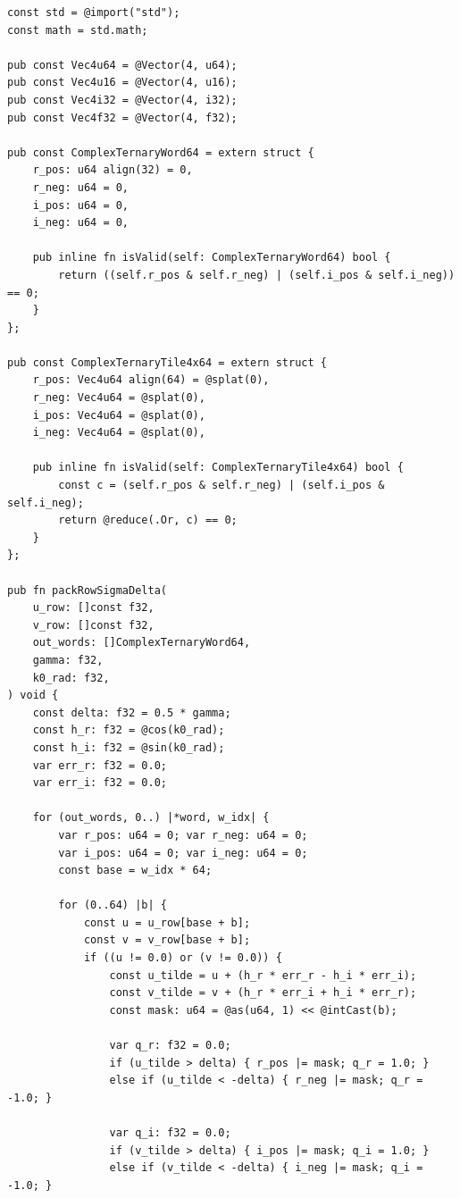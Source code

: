 \documentclass[10pt, twocolumn, a4paper]{article}
\begin{document}
\begin{lstlisting}[caption={Zig $\Sigma\Delta$ bit-plane packer and 4-row SIMD contraction kernel. The packer uses \texttt{f32} arithmetic; see Section~\ref{sec:seal}.}]
const std = @import("std");
const math = std.math;

pub const Vec4u64 = @Vector(4, u64);
pub const Vec4u16 = @Vector(4, u16);
pub const Vec4i32 = @Vector(4, i32);
pub const Vec4f32 = @Vector(4, f32);

pub const ComplexTernaryWord64 = extern struct {
    r_pos: u64 align(32) = 0,
    r_neg: u64 = 0,
    i_pos: u64 = 0,
    i_neg: u64 = 0,

    pub inline fn isValid(self: ComplexTernaryWord64) bool {
        return ((self.r_pos & self.r_neg) | (self.i_pos & self.i_neg)) == 0;
    }
};

pub const ComplexTernaryTile4x64 = extern struct {
    r_pos: Vec4u64 align(64) = @splat(0),
    r_neg: Vec4u64 = @splat(0),
    i_pos: Vec4u64 = @splat(0),
    i_neg: Vec4u64 = @splat(0),

    pub inline fn isValid(self: ComplexTernaryTile4x64) bool {
        const c = (self.r_pos & self.r_neg) | (self.i_pos & self.i_neg);
        return @reduce(.Or, c) == 0;
    }
};

pub fn packRowSigmaDelta(
    u_row: []const f32,
    v_row: []const f32,
    out_words: []ComplexTernaryWord64,
    gamma: f32,
    k0_rad: f32,
) void {
    const delta: f32 = 0.5 * gamma;
    const h_r: f32 = @cos(k0_rad);
    const h_i: f32 = @sin(k0_rad);
    var err_r: f32 = 0.0;
    var err_i: f32 = 0.0;

    for (out_words, 0..) |*word, w_idx| {
        var r_pos: u64 = 0; var r_neg: u64 = 0;
        var i_pos: u64 = 0; var i_neg: u64 = 0;
        const base = w_idx * 64;

        for (0..64) |b| {
            const u = u_row[base + b];
            const v = v_row[base + b];
            if ((u != 0.0) or (v != 0.0)) {
                const u_tilde = u + (h_r * err_r - h_i * err_i);
                const v_tilde = v + (h_r * err_i + h_i * err_r);
                const mask: u64 = @as(u64, 1) << @intCast(b);

                var q_r: f32 = 0.0;
                if (u_tilde > delta) { r_pos |= mask; q_r = 1.0; }
                else if (u_tilde < -delta) { r_neg |= mask; q_r = -1.0; }

                var q_i: f32 = 0.0;
                if (v_tilde > delta) { i_pos |= mask; q_i = 1.0; }
                else if (v_tilde < -delta) { i_neg |= mask; q_i = -1.0; }


\end{lstlisting}
\end{document}
